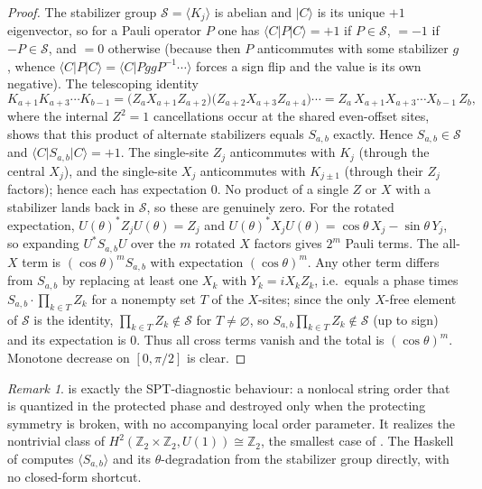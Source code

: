 \documentclass[12pt]{article}
\newcommand{\Ztwo}{\mathbb{Z}_2}
\theoremstyle{definition}
\theoremstyle{remark}
\newtheorem{remark}[theorem]{Remark}
\begin{document}
\begin{proof}
The stabilizer group $\mathcal{S}=\langle K_j\rangle$ is abelian and $\lvert C\rangle$ is its
unique $+1$ eigenvector, so for a Pauli operator $P$ one has $\langle C\rvert P\lvert
C\rangle=+1$ if $P\in\mathcal{S}$, $=-1$ if $-P\in\mathcal{S}$, and $=0$ otherwise (because
then $P$ anticommutes with some stabilizer $g$, whence $\langle C\rvert P\lvert
C\rangle=\langle C\rvert PggP^{-1}\cdots\rangle$ forces a sign flip and the value is its own
negative). The telescoping identity
\[
  K_{a+1}K_{a+3}\cdots K_{b-1}
  = \bigl(Z_a X_{a+1}Z_{a+2}\bigr)\bigl(Z_{a+2}X_{a+3}Z_{a+4}\bigr)\cdots
  = Z_a\,X_{a+1}X_{a+3}\cdots X_{b-1}\,Z_b ,
\]
where the internal $Z^2=1$ cancellations occur at the shared even-offset sites, shows that
this product of alternate stabilizers equals $S_{a,b}$ exactly. Hence $S_{a,b}\in\mathcal{S}$
and $\langle C\rvert S_{a,b}\lvert C\rangle=+1$. The single-site $Z_j$ anticommutes with $K_j$
(through the central $X_j$), and the single-site $X_j$ anticommutes with $K_{j\pm1}$ (through
their $Z_j$ factors); hence each has expectation $0$. No product of a single $Z$ or $X$ with a
stabilizer lands back in $\mathcal{S}$, so these are genuinely zero. For the rotated expectation, $U(\theta)^\ast Z_j U(\theta)=Z_j$ and
$U(\theta)^\ast X_j U(\theta)=\cos\theta\,X_j-\sin\theta\,Y_j$, so expanding
$U^\ast S_{a,b}U$ over the $m$ rotated $X$ factors gives $2^m$ Pauli terms. The all-$X$ term
is $(\cos\theta)^m S_{a,b}$ with expectation $(\cos\theta)^m$. Any other term differs from
$S_{a,b}$ by replacing at least one $X_k$ with $Y_k=iX_kZ_k$, i.e.\ equals a phase times
$S_{a,b}\cdot\prod_{k\in T}Z_k$ for a nonempty set $T$ of the $X$-sites; since the only
$X$-free element of $\mathcal{S}$ is the identity, $\prod_{k\in T}Z_k\notin\mathcal{S}$ for
$T\ne\varnothing$, so $S_{a,b}\prod_{k\in T}Z_k\notin\mathcal{S}$ (up to sign) and its
expectation is $0$. Thus all cross terms vanish and the total is $(\cos\theta)^m$. Monotone
decrease on $[0,\pi/2]$ is clear.
\end{proof}

\begin{remark}
 is exactly the SPT-diagnostic behaviour: a nonlocal string order that is
quantized in the protected phase and destroyed only when the protecting symmetry is broken,
with no accompanying local order parameter. It realizes the nontrivial class of
$H^2(\Ztwo\times\Ztwo,U(1))\cong\Ztwo$, the smallest case of . The Haskell of
 computes $\langle S_{a,b}\rangle$ and its $\theta$-degradation from the
stabilizer group directly, with no closed-form shortcut.
\end{remark}
\end{document}
